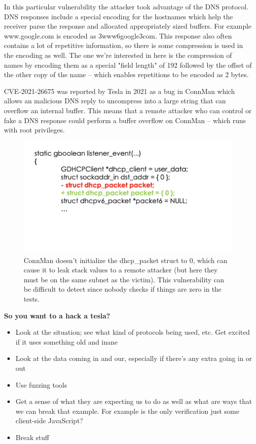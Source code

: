 \documentclass[../notes.tex]{subfiles}
\begin{document}
In this particular vulnerability the attacker took advantage of the DNS protocol.
DNS responses include a special encoding for the hostnames which help the receiver parse the response and allocated appropriately sized buffers. For example www.google.com is encoded as 3www6google3com.
This response also often contains a lot of repetitive information, so there is some compression is used in the encoding as well. The one we're interested in here is the compression of names by encoding them as a special "field length" of 192 followed by the offset of the other copy of the name -- which enables repetitions to be encoded as 2 bytes.

CVE-2021-26675 was reported by Tesla in 2021 as a bug in ConnMan which allows an malicious DNS reply to uncompress into a large string that can overflow an internal buffer.
This means that a remote attacker who can control or fake a DNS response could perform a buffer overflow on ConnMan -- which runs with root privileges.

\begin{figure}[H]
    \centering
    \includegraphics[width=0.8\linewidth]{img/image_2023-01-23-19-05-37.png}
    \caption{ConnMan doesn't initialize the dhcp\_packet struct to 0, which can cause it to leak stack values to a remote attacker (but here they must be on the same subnet as the victim). This vulnerability can be difficult to detect since nobody checks if things are zero in the tests.}
\end{figure}


\begin{blockquote}
    \textbf{So you want to a hack a tesla?}
    \begin{itemize}
        \item Look at the situation; see what kind of protocols being used, etc. Get excited if it uses something old and inane
        \item Look at the data coming in and our, especially if there's any extra going in or out
        \item Use fuzzing tools
        \item Get a sense of what they are expecting us to do as well as what are ways that we can break that example. For example is the only verification just some client-side JavaScript?
        \item Break stuff
    \end{itemize}
\end{blockquote}
\end{document}
